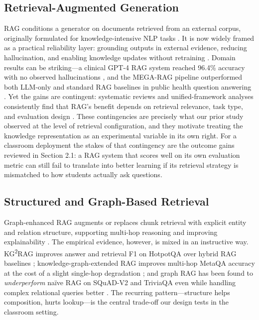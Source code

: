\documentclass[letterpaper]{article} %
\begin{document}
\subsection{Retrieval-Augmented Generation}

RAG conditions a generator on documents retrieved from an external corpus, originally formulated for knowledge-intensive NLP tasks \citep{lewis2020retrieval}. It is now widely framed as a practical reliability layer: grounding outputs in external evidence, reducing hallucination, and enabling knowledge updates without retraining \citep{peng2024graph,neha2025retrieval,li2024enhancing}. Domain results can be striking---a clinical GPT-4 RAG system reached 96.4\% accuracy with no observed hallucinations \citep{ke2025retrieval}, and the MEGA-RAG pipeline outperformed both LLM-only and standard RAG baselines in public health question answering \citep{xu2025megarag}. Yet the gains are contingent: systematic reviews and unified-framework analyses consistently find that RAG's benefit depends on retrieval relevance, task type, and evaluation design \citep{zhou2025indepth,brown2025systematic}. These contingencies are precisely what our prior study observed at the level of retrieval configuration, and they motivate treating the knowledge representation as an experimental variable in its own right. For a classroom deployment the stakes of that contingency are the outcome gains reviewed in Section 2.1: a RAG system that scores well on its own evaluation metric can still fail to translate into better learning if its retrieval strategy is mismatched to how students actually ask questions.

\subsection{Structured and Graph-Based Retrieval}

Graph-enhanced RAG augments or replaces chunk retrieval with explicit entity and relation structure, supporting multi-hop reasoning and improving explainability \citep{peng2024graph,zhu2025graphsurvey}. The empirical evidence, however, is mixed in an instructive way. KG\textsuperscript{2}RAG improves answer and retrieval F1 on HotpotQA over hybrid RAG baselines \citep{zhu2025kg2rag}; knowledge-graph-extended RAG improves multi-hop MetaQA accuracy at the cost of a slight single-hop degradation \citep{linders2025knowledge}; and graph RAG has been found to \emph{underperform} na\"ive RAG on SQuAD-V2 and TriviaQA even while handling complex relational queries better \citep{aboulela2025exploring}. The recurring pattern---structure helps composition, hurts lookup---is the central trade-off our design tests in the classroom setting.
\end{document}
